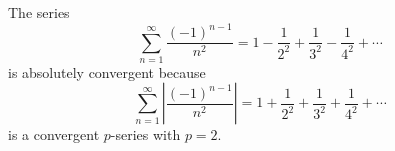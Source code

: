 \begin{frame}
\begin{example}[Example 1, p. 750]
The series
\[
\sum_{n=1}^\infty \frac{(-1)^{n-1}}{n^2} = 1 - \frac{1}{2^2} + \frac{1}{3^2} - \frac{1}{4^2} + \cdots%
\]
is absolutely convergent because
\[
\sum_{n=1}^\infty \left| \frac{(-1)^{n-1}}{n^2}\right|  = 1 + \frac{1}{2^2} + \frac{1}{3^2} + \frac{1}{4^2} + \cdots%
\]
is a convergent $p$-series with $p = 2$.
\end{example}
\end{frame}
